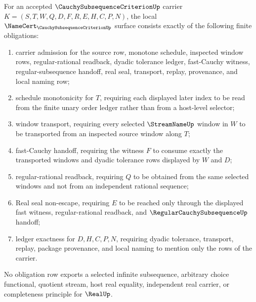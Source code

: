 \begin{theorem}
\label{thm:cauchy-subsequence-criterion-namecert-obligations}
For an accepted $\CauchySubsequenceCriterionUp$ carrier $K=(S,T,W,Q,D,F,R,E,H,C,P,N)$, the local $\NameCert_{\CauchySubsequenceCriterionUp}$ surface consists exactly of the following finite obligations:
\begin{enumerate}
\item carrier admission for the source row, monotone schedule, inspected window rows, regular-rational readback, dyadic tolerance ledger, fast-Cauchy witness, regular-subsequence handoff, real seal, transport, replay, provenance, and local naming row;
\item schedule monotonicity for $T$, requiring each displayed later index to be read from the finite unary order ledger rather than from a host-level selector;
\item window transport, requiring every selected $\StreamNameUp$ window in $W$ to be transported from an inspected source window along $T$;
\item fast-Cauchy handoff, requiring the witness $F$ to consume exactly the transported windows and dyadic tolerance rows displayed by $W$ and $D$;
\item regular-rational readback, requiring $Q$ to be obtained from the same selected windows and not from an independent rational sequence;
\item Real seal non-escape, requiring $E$ to be reached only through the displayed fast witness, regular-rational readback, and $\RegularCauchySubsequenceUp$ handoff;
\item ledger exactness for $D,H,C,P,N$, requiring dyadic tolerance, transport, replay, package provenance, and local naming to mention only the rows of the carrier.
\end{enumerate}
No obligation row exports a selected infinite subsequence, arbitrary choice functional, quotient stream, host real equality, independent real carrier, or completeness principle for $\RealUp$.
\end{theorem}

